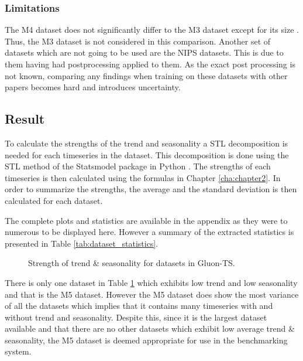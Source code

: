 \subsubsection{Limitations}
The M4 dataset does not significantly differ to the M3 dataset except for its size \cite{m3_vs_M4}. Thus, the M3 dataset is not considered in this comparison. Another set of datasets which are not going to be used are the NIPS datasets. This is due to them having had postprocessing applied to them. As the exact post processing is not known, comparing any findings when training on these datasets with other papers becomes hard and introduces uncertainty.

\subsection{Result}
To calculate the strengths of the trend and seasonality a STL decomposition is needed for each timeseries in the dataset. This decomposition is done using the STL method of the Statsmodel package in Python \cite{seabold2010statsmodels}. The strengths of each timeseries is then calculated using the formulas in Chapter \ref{cha:chapter2}. In order to summarize the strengths, the average and the standard deviation is then calculated for each dataset.

The complete plots and statistics are available in the appendix as they were to numerous to be displayed here. However a summary of the extracted statistics is presented in Table \ref{tab:dataset_statistics}.


\begin{figure}[h]
  \centering
  \caption{Strength of trend \& seasonality for datasets in Gluon-TS.}
  \label{heatmap_strengths}
\end{figure}
There is only one dataset in Table \ref{heatmap_strengths} which exhibits low trend and low seasonality and that is the M5 dataset. However the M5 dataset does show the most variance of all the datasets which implies that it contains many timeseries with and without trend and seasonality. Despite this, since it is the largest dataset available and that there are no other datasets which exhibit low average trend \& seasonality, the M5 dataset is deemed appropriate for use in the benchmarking system.

